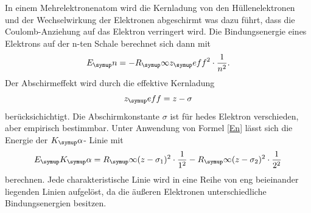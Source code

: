 In einem Mehrelektronenatom wird die Kernladung von den Hüllenelektronen und
der Wechselwirkung der Elektronen abgeschirmt was dazu führt, dass die
Coulomb-Anziehung auf das Elektron verringert wird. Die Bindungsenergie eines
Elektrons auf der n-ten Schale berechnet sich dann mit
\begin{equation}
  E_\su{n}=-R_\su{\infty}z_\su{eff}^2\cdot \frac{1}{n^2}.
  \label{En}
\end{equation}
Der Abschirmeffekt wird durch die effektive Kernladung
\begin{equation*}
  z_\su{eff}=z-\sigma
\end{equation*}
berücksichichtigt. Die Abschirmkonstante $\sigma$ ist für hedes Elektron
verschieden, aber empirisch bestimmbar.
Unter Anwendung von Formel \eqref{En} lässt sich die Energie der $K_\su{\alpha}$-
Linie mit
\begin{equation}
  E_\su{K_\su{\alpha}}=R_\su{\infty}(z-\sigma_1)^2\cdot\frac{1}{1^2}
  -R_\su{\infty}(z-\sigma_2)^2\cdot\frac{1}{2^2}
  \label{EKAlpha}
\end{equation}
berechnen. Jede charakteristische Linie wird in eine Reihe von eng beieinander
liegenden Linien aufgelöst, da die äußeren Elektronen unterschiedliche
Bindungsenergien besitzen.
